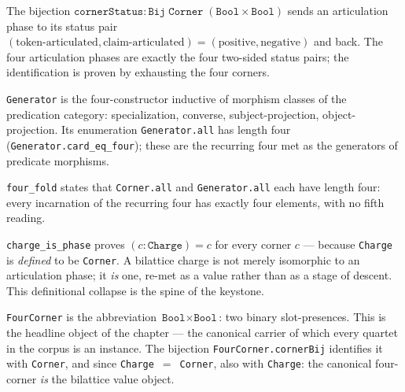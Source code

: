 \begin{definition}\label{def:corner-status}\leanok{}
The bijection $\texttt{cornerStatus} : \texttt{Bij}\;\texttt{Corner}\;(\texttt{Bool} \times \texttt{Bool})$ sends an articulation phase to its status pair $(\text{token-articulated}, \text{claim-articulated}) = (\text{positive}, \text{negative})$ and back. The four articulation phases are exactly the four two-sided status pairs; the identification is proven by exhausting the four corners.
\end{definition}

\begin{definition}\label{def:generator}\leanok{}
\texttt{Generator} is the four-constructor inductive of morphism classes of the predication category: specialization, converse, subject-projection, object-projection. Its enumeration \texttt{Generator.all} has length four (\texttt{Generator.card\_eq\_four}); these are the recurring four met as the generators of predicate morphisms.
\end{definition}

\begin{theorem}\label{thm:four-fold}\leanok{}
\texttt{four\_fold} states that \texttt{Corner.all} and \texttt{Generator.all} each have length four: every incarnation of the recurring four has exactly four elements, with no fifth reading.
\end{theorem}

\begin{theorem}\label{thm:charge-is-phase}\leanok{}
\texttt{charge\_is\_phase} proves $(c : \texttt{Charge}) = c$ for every corner $c$ --- because \texttt{Charge} is \emph{defined} to be \texttt{Corner}. A bilattice charge is not merely isomorphic to an articulation phase; it \emph{is} one, re-met as a value rather than as a stage of descent. This definitional collapse is the spine of the keystone.
\end{theorem}

\begin{definition}\label{def:four-object}\leanok{}
\texttt{FourCorner} is the abbreviation $\texttt{Bool} \times \texttt{Bool}$: two binary slot-presences. This is the headline object of the chapter --- the canonical carrier of which every quartet in the corpus is an instance. The bijection \texttt{FourCorner.cornerBij} identifies it with \texttt{Corner}, and since \texttt{Charge}~$=$~\texttt{Corner}, also with \texttt{Charge}: the canonical four-corner \emph{is} the bilattice value object.
\end{definition}

